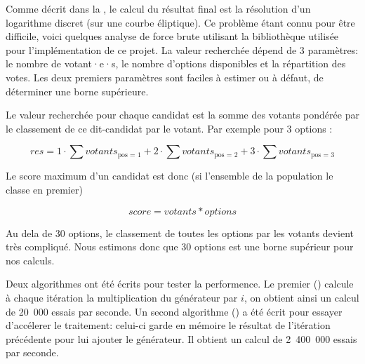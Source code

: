 \documentclass[../report]{subfiles}
\begin{document}
Comme décrit dans la , le calcul du résultat final est la résolution d'un logarithme discret (sur une courbe éliptique).
Ce problème étant connu pour être difficile, voici quelques analyse de force brute utilisant la bibliothèque utilisée
pour l'implémentation de ce projet.
La valeur recherchée dépend de 3 paramètres: le nombre de votant·e·s, le nombre d'options disponibles et la répartition des votes.
Les deux premiers paramètres sont faciles à estimer ou à défaut, de déterminer une borne supérieure.

Le valeur recherchée pour chaque candidat est la somme des votants pondérée par le classement de ce dit-candidat par le votant.
Par exemple pour 3 options :

\[
  res = 1 \cdot \sum votants_{\text{pos = 1}}
      + 2 \cdot \sum votants_{\text{pos = 2}}
      + 3 \cdot \sum votants_{\text{pos = 3}}
\]

Le score maximum d'un candidat est donc (si l'ensemble de la population le classe en premier)

\[
  score = votants * options 
\]

Au dela de 30 options, le classement de toutes les options par les votants devient très compliqué.
Nous estimons donc que 30 options est une borne supérieur pour nos calculs.

Deux algorithmes ont été écrits pour tester la performence.
Le premier () calcule à chaque itération la multiplication du générateur 
par $i$, on obtient ainsi un calcul de 20~000 essais par seconde.
Un second algorithme () a été écrit pour essayer d'accélerer le 
traitement: celui-ci garde en mémoire le résultat de l'itération précédente pour lui ajouter le générateur.
Il obtient un calcul de 2~400~000 essais par seconde.
\end{document}
